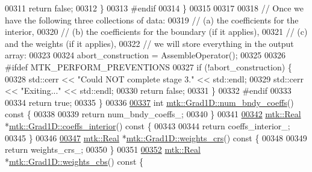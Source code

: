 \begin{DoxyCode}
{{00311       \textcolor{keywordflow}{return} \textcolor{keyword}{false};
00312     \}
00313 \textcolor{preprocessor}{    #endif}
00314   \}
00315 
00317 
00318   \textcolor{comment}{// Once we have the following three collections of data:}
00319   \textcolor{comment}{//   (a) the coefficients for the interior,}
00320   \textcolor{comment}{//   (b) the coefficients for the boundary (if it applies),}
00321   \textcolor{comment}{//   (c) and the weights (if it applies),}
00322   \textcolor{comment}{// we will store everything in the output array:}
00323 
00324   abort\_construction = AssembleOperator();
00325 
00326 \textcolor{preprocessor}{  #ifdef MTK\_PERFORM\_PREVENTIONS}
00327   \textcolor{keywordflow}{if} (!abort\_construction) \{
00328     std::cerr << \textcolor{stringliteral}{"Could NOT complete stage 3."} << std::endl;
00329     std::cerr << \textcolor{stringliteral}{"Exiting..."} << std::endl;
00330     \textcolor{keywordflow}{return} \textcolor{keyword}{false};
00331   \}
00332 \textcolor{preprocessor}{  #endif}
00333 
00334   \textcolor{keywordflow}{return} \textcolor{keyword}{true};
00335 \}
00336 
\hypertarget{mtk__grad__1d_8cc_source_l00337}{}\hyperlink{classmtk_1_1Grad1D_a7168205c21ba00012558f8bba069c119}{00337} \textcolor{keywordtype}{int} \hyperlink{classmtk_1_1Grad1D_a7168205c21ba00012558f8bba069c119}{mtk::Grad1D::num\_bndy\_coeffs}()\textcolor{keyword}{ const }\{
00338 
00339   \textcolor{keywordflow}{return} num\_bndy\_coeffs\_;
00340 \}
00341 
\hypertarget{mtk__grad__1d_8cc_source_l00342}{}\hyperlink{classmtk_1_1Grad1D_a88735f8d2a6ed986370dc3caeb84959b}{00342} \hyperlink{group__c01-roots_gac080bbbf5cbb5502c9f00405f894857d}{mtk::Real} *\hyperlink{classmtk_1_1Grad1D_a88735f8d2a6ed986370dc3caeb84959b}{mtk::Grad1D::coeffs\_interior}()\textcolor{keyword}{ const }\{
00343 
00344   \textcolor{keywordflow}{return} coeffs\_interior\_;
00345 \}
00346 
\hypertarget{mtk__grad__1d_8cc_source_l00347}{}\hyperlink{classmtk_1_1Grad1D_ae5f15d8986a5680b6a1c120283c6cc5e}{00347} \hyperlink{group__c01-roots_gac080bbbf5cbb5502c9f00405f894857d}{mtk::Real} *\hyperlink{classmtk_1_1Grad1D_ae5f15d8986a5680b6a1c120283c6cc5e}{mtk::Grad1D::weights\_crs}()\textcolor{keyword}{ const }\{
00348 
00349   \textcolor{keywordflow}{return} weights\_crs\_;
00350 \}
00351 
\hypertarget{mtk__grad__1d_8cc_source_l00352}{}\hyperlink{classmtk_1_1Grad1D_ad11927d8f9f1ca0089aaa2be7094f7f3}{00352} \hyperlink{group__c01-roots_gac080bbbf5cbb5502c9f00405f894857d}{mtk::Real} *\hyperlink{classmtk_1_1Grad1D_ad11927d8f9f1ca0089aaa2be7094f7f3}{mtk::Grad1D::weights\_cbs}()\textcolor{keyword}{ const }\{
}}
\end{DoxyCode}
